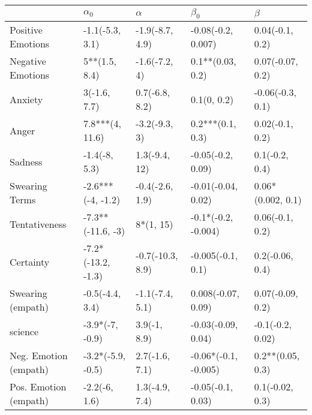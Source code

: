\begin{tabular}{lllll}
\toprule
{} &          $\alpha_0$ &          $\alpha$ &             $\beta_0$ &            $\beta$ \\
\midrule
Positive Emotions     &     -1.1(-5.3, 3.1) &   -1.9(-8.7, 4.9) &    -0.08(-0.2, 0.007) &    0.04(-0.1, 0.2) \\
Negative Emotions     &       5**(1.5, 8.4) &     -1.6(-7.2, 4) &      0.1**(0.03, 0.2) &   0.07(-0.07, 0.2) \\
Anxiety               &        3(-1.6, 7.7) &    0.7(-6.8, 8.2) &           0.1(0, 0.2) &   -0.06(-0.3, 0.1) \\
Anger                 &     7.8***(4, 11.6) &     -3.2(-9.3, 3) &      0.2***(0.1, 0.3) &    0.02(-0.1, 0.2) \\
Sadness               &       -1.4(-8, 5.3) &     1.3(-9.4, 12) &     -0.05(-0.2, 0.09) &     0.1(-0.2, 0.4) \\
Swearing Terms        &   -2.6***(-4, -1.2) &   -0.4(-2.6, 1.9) &    -0.01(-0.04, 0.02) &  0.06*(0.002, 0.1) \\
Tentativeness         &   -7.3**(-11.6, -3) &         8*(1, 15) &   -0.1*(-0.2, -0.004) &    0.06(-0.1, 0.2) \\
Certainty             &  -7.2*(-13.2, -1.3) &  -0.7(-10.3, 8.9) &     -0.005(-0.1, 0.1) &    0.2(-0.06, 0.4) \\
Swearing (empath)     &     -0.5(-4.4, 3.4) &   -1.1(-7.4, 5.1) &    0.008(-0.07, 0.09) &   0.07(-0.09, 0.2) \\
science               &     -3.9*(-7, -0.9) &      3.9(-1, 8.9) &    -0.03(-0.09, 0.04) &   -0.1(-0.2, 0.02) \\
Neg. Emotion (empath) &   -3.2*(-5.9, -0.5) &    2.7(-1.6, 7.1) &  -0.06*(-0.1, -0.005) &   0.2**(0.05, 0.3) \\
Pos. Emotion (empath) &       -2.2(-6, 1.6) &    1.3(-4.9, 7.4) &     -0.05(-0.1, 0.03) &    0.1(-0.02, 0.3) \\
\bottomrule
\end{tabular}
